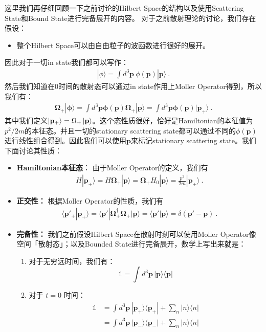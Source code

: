 这里我们再仔细回顾一下之前讨论的Hilbert Space的结构以及使用Scattering State和Bound State进行完备展开的内容。
对于之前散射理论的讨论，我们存在假设：
\begin{itemize}
  \item 整个Hilbert Space可以由自由粒子的波函数进行很好的展开。
\end{itemize}
因此对于一切in state我们都可以写作：
\begin{align}
  |\phi\rangle=\int d^3\mathbf{p}\ \phi(\mathbf{p})|\mathbf{p}\rangle\mathrm{~.}
\end{align}
然后我们知道在0时间的散射态可以通过in state作用上Moller Operator得到，所以我们有：
\begin{align}
  \boldsymbol{\Omega}_+|\boldsymbol{\phi}\rangle=\int
  d^3\mathbf{p}\boldsymbol{\phi}(\mathbf{p})\boldsymbol{\Omega}_+|\mathbf{p}\rangle=\int
  d^3\mathbf{p}\boldsymbol{\phi}(\mathbf{p})|\mathbf{p}_+\rangle\mathrm{~.}
\end{align}
其中我们定义$ \ket{\mathbf{p}_+} = \Omega_+ \ket{\mathbf{p}}
$。这个态性质很好，恰好是Hamiltonian的本征值为$ p^2/2m $的本征态。并且一切的stationary
scattering state都可以通过不同的$ \phi(\mathbf{p}) $进行线性组合得到。因此我们可以使用$
\mathbf{p} $来标记stationary scattering state。我们下面讨论其性质：
\begin{itemize}
  \item \textbf{Hamiltonian本征态}：
    由于Moller Operator的定义，我们有
    \begin{align}
      H|\mathbf{p}_+\rangle=H\boldsymbol{\Omega}_+|\mathbf{p}\rangle=\boldsymbol{\Omega}_+H_0|\mathbf{p}\rangle=\frac{p^2}{2m}|\mathbf{p}_+\rangle\mathrm{~.}
    \end{align}
  \item \textbf{正交性：} 根据Moller Operator的性质，我们有
    \begin{align}
      \langle \mathbf{p}'_+|\mathbf{p}_+\rangle=\langle
      \mathbf{p}'|\boldsymbol{\Omega}_+^\dagger\boldsymbol{\Omega}_+|\mathbf{p}\rangle=\langle
      \mathbf{p}'|\mathbf{p}\rangle=\delta(\mathbf{p}'-\mathbf{p})\mathrm{~.}
    \end{align}
  \item \textbf{完备性：} 我们之前假设Hilbert Space在散射时刻可以使用Moller
    Operator像空间「散射态」；以及Bounded State进行完备展开，数学上写出来就是：
    \begin{enumerate}
      \item 对于无穷远时间，我们有：
        \begin{equation}
          \mathbb{1} = \int d^3\mathbf{p}\,|\mathbf{p}\rangle\langle\mathbf{p}|
        \end{equation}

      \item 对于 $t=0$ 时间：
        \begin{align}
          \mathbb{1}
          &= \int d^3\mathbf{p}\,|\mathbf{p}_+\rangle\langle\mathbf{p}_+|
          + \sum_n |n\rangle\langle n|\\
          &= \int d^3\mathbf{p}\,|\mathbf{p}_-\rangle\langle\mathbf{p}_-|
          + \sum_n |n\rangle\langle n|
        \end{align}
    \end{enumerate}
\end{itemize}
